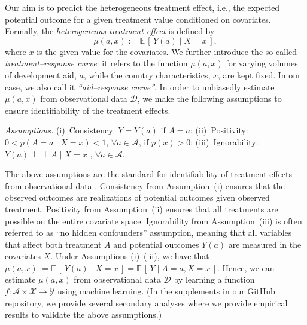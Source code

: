 \documentclass[sigconf]{acmart}
\begin{document}
Our aim is to predict the heterogeneous treatment effect, i.e., the expected potential outcome for a given treatment value conditioned on covariates. Formally, the \emph{heterogeneous treatment effect} is defined by
\begin{equation}
\mu(a,x) := \mathbb{E} \, [ \, Y(a) \mid X = x \, ], 
\end{equation}
where $x$ is the given value for the covariates. We further introduce the so-called \emph{treatment--response curve}: it refers to the function $\mu(a,x)$ for varying volumes of development aid, $a$, while the country characteristics, $x$, are kept fixed. In our case, we also call it \emph{``aid--response curve''}. In order to unbiasedly estimate $\mu(a,x)$ from observational data $\mathcal{D}$, we make the following assumptions to ensure identifiability of the treatment effects.

\emph{Assumptions.} %
(i)~Consistency: {$Y = Y(a)$ if $A = a$};
(ii)~Positivity: {$0 < p(A = a \mid X = x) < 1$, $\forall a \in \mathcal{A}$, if $p(x) > 0 $};
(iii)~Ignorability: {$Y(a) \perp \!\!\! \perp A \mid X = x \, \, $, $\forall a \in \mathcal{A}$}.

The above assumptions are the standard for identifiability of treatment effects from observational data \cite{Pearl2009, Imbens2015} . Consistency from Assumption~(i) ensures that the observed outcomes are realizations of potential outcomes given observed treatment. Positivity from Assumption~(ii) ensures that all treatments are possible on the entire covariate space. Ignorability from Assumption~(iii) is often referred to as ``no hidden confounders'' assumption, meaning that all variables that affect both treatment $A$ and potential outcomes $Y(a)$ are measured in the covariates $X$. Under Assumptions (i)--(iii), we have that $\mu(a,x) := \mathbb{E} \, [ \, Y(a) \mid X = x \, ] = \mathbb{E} \, [ \, Y \mid A = a, X = x \, ]$. Hence, we can estimate $\mu(a,x)$ from observational data $\mathcal{D}$ by learning a function $f: \mathcal{A} \times \mathcal{X} \rightarrow \mathcal{Y}$ using machine learning. (In the supplements in our GitHub repository, we provide several secondary analyses where we provide empirical results to validate the above assumptions.) 
\end{document}
